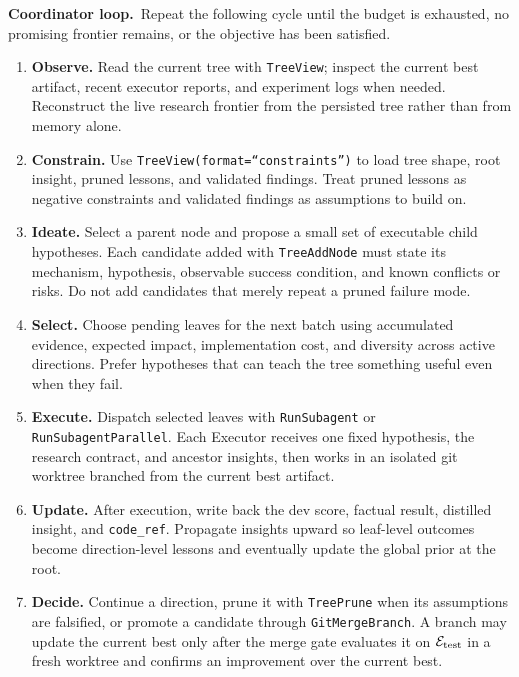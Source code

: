 \begin{promptbox}[title=\textbf{Coordinator Prompt}]
\smallskip
\noindent\textbf{Coordinator loop.}~Repeat the following cycle until the
budget is exhausted, no promising frontier remains, or the objective has been
satisfied.
\begin{enumerate}[label=\textbf{\arabic*.},leftmargin=1.6em,itemsep=2pt,topsep=2pt]
  \item \textbf{Observe.} Read the current tree with \texttt{TreeView}; inspect
  the current best artifact, recent executor reports, and experiment logs when
  needed. Reconstruct the live research frontier from the persisted tree rather
  than from memory alone.
  \item \textbf{Constrain.} Use \texttt{TreeView(format=``constraints'')} to
  load tree shape, root insight, pruned lessons, and validated findings. Treat
  pruned lessons as negative constraints and validated findings as assumptions
  to build on.
  \item \textbf{Ideate.} Select a parent node and propose a small set of
  executable child hypotheses. Each candidate added with \texttt{TreeAddNode}
  must state its mechanism, hypothesis, observable success condition, and known
  conflicts or risks. Do not add candidates that merely repeat a pruned failure
  mode.
  \item \textbf{Select.} Choose pending leaves for the next batch using
  accumulated evidence, expected impact, implementation cost, and diversity
  across active directions. Prefer hypotheses that can teach the tree something
  useful even when they fail.
  \item \textbf{Execute.} Dispatch selected leaves with \texttt{RunSubagent} or
  \texttt{RunSubagentParallel}. Each Executor receives one fixed hypothesis,
  the research contract, and ancestor insights, then works in an isolated git
  worktree branched from the current best artifact.
  \item \textbf{Update.} After execution, write back the dev score, factual
  result, distilled insight, and \texttt{code\_ref}. Propagate insights upward
  so leaf-level outcomes become direction-level lessons and eventually update
  the global prior at the root.
  \item \textbf{Decide.} Continue a direction, prune it with \texttt{TreePrune}
  when its assumptions are falsified, or promote a candidate through
  \texttt{GitMergeBranch}. A branch may update the current best only after the
  merge gate evaluates it on $\mathcal{E}_{\mathrm{test}}$ in a fresh worktree and confirms an
  improvement over the current best.
\end{enumerate}


\end{promptbox}

